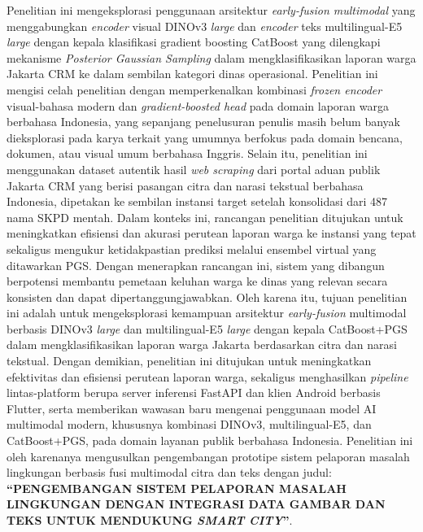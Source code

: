 Penelitian ini mengeksplorasi penggunaan arsitektur \textit{early-fusion multimodal} yang menggabungkan \textit{encoder} visual DINOv3 \textit{large} \citep{simeoniDINOv32025} dan \textit{encoder} teks multilingual-E5 \textit{large} \citep{wangE5Multilingual2024} dengan kepala klasifikasi gradient boosting CatBoost \citep{prokhorenkovaCatBoost2018} yang dilengkapi mekanisme \textit{Posterior Gaussian Sampling} \citep{ustimenkoCatBoostUncertainty2023} dalam mengklasifikasikan laporan warga Jakarta CRM ke dalam sembilan kategori dinas operasional. Penelitian ini mengisi celah penelitian dengan memperkenalkan kombinasi \textit{frozen encoder} visual-bahasa modern dan \textit{gradient-boosted head} pada domain laporan warga berbahasa Indonesia, yang sepanjang penelusuran penulis masih belum banyak dieksplorasi pada karya terkait \citep{radfordCLIP2021,audebertMultimodalDoc2019,ofliMultimodalDisaster2020,alamCrisisMMD2018,koshyMultimodalTweet2023} yang umumnya berfokus pada domain bencana, dokumen, atau visual umum berbahasa Inggris. Selain itu, penelitian ini menggunakan dataset autentik hasil \textit{web scraping} dari portal aduan publik Jakarta CRM yang berisi pasangan citra dan narasi tekstual berbahasa Indonesia, dipetakan ke sembilan instansi target setelah konsolidasi dari 487 nama SKPD mentah. Dalam konteks ini, rancangan penelitian ditujukan untuk meningkatkan efisiensi dan akurasi perutean laporan warga ke instansi yang tepat sekaligus mengukur ketidakpastian prediksi melalui ensembel virtual yang ditawarkan PGS. Dengan menerapkan rancangan ini, sistem yang dibangun berpotensi membantu pemetaan keluhan warga ke dinas yang relevan secara konsisten dan dapat dipertanggungjawabkan. Oleh karena itu, tujuan penelitian ini adalah untuk mengeksplorasi kemampuan arsitektur \textit{early-fusion} multimodal berbasis DINOv3 \textit{large} dan multilingual-E5 \textit{large} dengan kepala CatBoost+PGS dalam mengklasifikasikan laporan warga Jakarta berdasarkan citra dan narasi tekstual. Dengan demikian, penelitian ini ditujukan untuk meningkatkan efektivitas dan efisiensi perutean laporan warga, sekaligus menghasilkan \textit{pipeline} lintas-platform berupa server inferensi FastAPI dan klien Android berbasis Flutter, serta memberikan wawasan baru mengenai penggunaan model AI multimodal modern, khususnya kombinasi DINOv3, multilingual-E5, dan CatBoost+PGS, pada domain layanan publik berbahasa Indonesia. Penelitian ini oleh karenanya mengusulkan pengembangan prototipe sistem pelaporan masalah lingkungan berbasis fusi multimodal citra dan teks dengan judul: \textbf{``PENGEMBANGAN SISTEM PELAPORAN MASALAH LINGKUNGAN DENGAN INTEGRASI DATA GAMBAR DAN TEKS UNTUK MENDUKUNG \textit{SMART CITY}''}.

